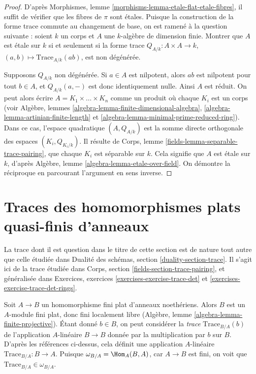 \begin{proof}
D'après Morphismes, lemme \ref{morphisms-lemma-etale-flat-etale-fibres},
il suffit de vérifier que les fibres de $\pi$ sont étales.
Puisque la construction de la forme trace commute au changement de
base, on est ramené à la question suivante : soient $k$ un corps
et $A$ une $k$-algèbre de dimension finie. Montrer que
$A$ est étale sur $k$ si et seulement si la forme trace
$Q_{A/k} : A \times A \to k$, $(a, b) \mapsto \text{Trace}_{A/k}(ab)$,
est non dégénérée.

\medskip\noindent
Supposons $Q_{A/k}$ non dégénérée. Si $a \in A$ est nilpotent, alors
$ab$ est nilpotent pour tout $b \in A$, et $Q_{A/k}(a, -)$ est donc
identiquement nulle. Ainsi $A$ est réduit. On peut alors écrire
$A = K_1 \times \ldots \times K_n$ comme un produit où chaque $K_i$
est un corps (voir
Algèbre, lemmes \ref{algebra-lemma-finite-dimensional-algebra},
\ref{algebra-lemma-artinian-finite-length} et
\ref{algebra-lemma-minimal-prime-reduced-ring}).
Dans ce cas, l'espace
quadratique $(A, Q_{A/k})$ est la somme directe orthogonale des espaces
$(K_i, Q_{K_i/k})$. Il résulte de
Corps, lemme \ref{fields-lemma-separable-trace-pairing},
que chaque $K_i$ est séparable sur $k$. Cela signifie que $A$ est étale
sur $k$, d'après Algèbre, lemme \ref{algebra-lemma-etale-over-field}.
On démontre la réciproque en parcourant l'argument en sens inverse.
\end{proof}





\section{Traces des homomorphismes plats quasi-finis d'anneaux}
\label{section-quasi-finite-traces}

\noindent
La trace dont il est question dans le titre de cette section est de nature tout
autre que celle étudiée dans
Dualité des schémas, section \ref{duality-section-trace}.
Il s'agit ici de la trace
étudiée dans Corps, section \ref{fields-section-trace-pairing},
et généralisée dans Exercices, exercices \ref{exercises-exercise-trace-det} et
\ref{exercises-exercise-trace-det-rings}.

\medskip\noindent
Soit $A \to B$ un homomorphisme fini plat d'anneaux noethériens. Alors $B$ est un
$A$-module fini plat, donc fini localement libre
(Algèbre, lemme \ref{algebra-lemma-finite-projective}).
Étant donné $b \in B$, on peut considérer la {\it trace} $\text{Trace}_{B/A}(b)$
de l'application $A$-linéaire $B \to B$ donnée par
la multiplication par $b$ sur $B$. D'après les références ci-dessus, cela définit
une application $A$-linéaire $\text{Trace}_{B/A} : B \to A$.
Puisque $\omega_{B/A} = \Hom_A(B, A)$, car $A \to B$ est fini, on voit
que $\text{Trace}_{B/A} \in \omega_{B/A}$.


